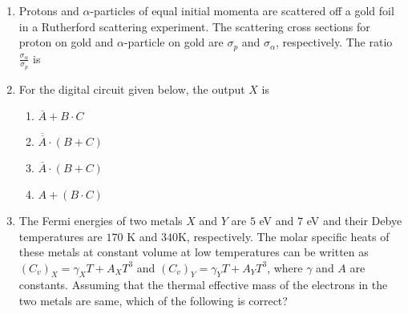 \documentclass{article}
\newcommand{\brak}[1]{\left( #1 \right)}
\begin{document}
\begin{enumerate}
    \item Protons and $\alpha$-particles of equal initial momenta are scattered off a gold foil in a Rutherford scattering experiment. The scattering cross sections for proton on gold and  
 $\alpha$-particle on gold are $\sigma_p$ and $\sigma_{\alpha}$, respectively. The ratio  
 $\frac{\sigma_{\alpha}}{\sigma_p}$ is \underline{\hspace{2cm}}

 \item For the digital circuit given below, the output $X$ is

    \begin{figure}[!ht]
\centering
{}%

\label{fig:my_label}
\end{figure}

    \begin{enumerate}
        \item $\overline{A} + B \cdot C$
        \item $\overline{\overline{A}} \cdot \brak{B + C}$
        \item $\overline{A} \cdot \brak{B + C}$
        \item $A + \brak{B \cdot C}$
    \end{enumerate}

    \item The Fermi energies of two metals $X$ and $Y$ are $5$ eV and $7$ eV and their Debye temperatures are $170$ K and $340 $K, respectively. The molar specific heats of these metals at constant volume at low temperatures can be written as $\brak{C_v}_X = \gamma_X T + A_X T^3$ and $\brak{C_v}_Y = \gamma_Y T + A_Y T^3$, where $\gamma$ and $A$ are constants. Assuming that the thermal effective mass of the electrons in the two metals are same, which of  
 the following is correct?


\end{enumerate}
\end{document}
